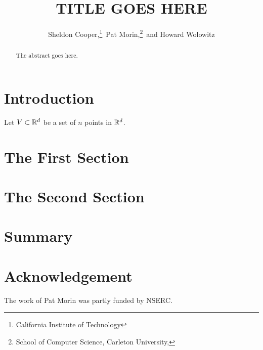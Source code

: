\documentclass{patmorin}
\title{\MakeUppercase{Title Goes Here}}
\author{Sheldon Cooper,\thanks{California Institute of Technology}\,
         Pat Morin,\thanks{School of Computer Science, Carleton University, \email{morin@scs.carleton.ca}}\,
         and Howard Wolowitz\footnotemark[1]}
\begin{document}
\maketitle

\begin{abstract}
  The abstract goes here.
\end{abstract}

\section{Introduction}


Let $V\subset \mathbb{R}^d$ be a set of $n$ points in $\mathbb{R}^d$. 

\section{The First Section}

\section{The Second Section}

\section{Summary}

\section*{Acknowledgement}

The work of Pat Morin was partly funded by NSERC.



\end{document}
